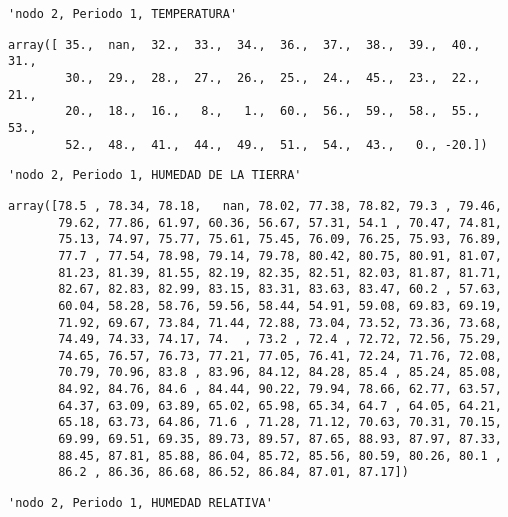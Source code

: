 \documentclass[11pt]{article}
\begin{document}
    
    
    \begin{verbatim}
'nodo 2, Periodo 1, TEMPERATURA'
    \end{verbatim}

    
    
    \begin{verbatim}
array([ 35.,  nan,  32.,  33.,  34.,  36.,  37.,  38.,  39.,  40.,  31.,
        30.,  29.,  28.,  27.,  26.,  25.,  24.,  45.,  23.,  22.,  21.,
        20.,  18.,  16.,   8.,   1.,  60.,  56.,  59.,  58.,  55.,  53.,
        52.,  48.,  41.,  44.,  49.,  51.,  54.,  43.,   0., -20.])
    \end{verbatim}

    
    
    \begin{verbatim}
'nodo 2, Periodo 1, HUMEDAD DE LA TIERRA'
    \end{verbatim}

    
    
    \begin{verbatim}
array([78.5 , 78.34, 78.18,   nan, 78.02, 77.38, 78.82, 79.3 , 79.46,
       79.62, 77.86, 61.97, 60.36, 56.67, 57.31, 54.1 , 70.47, 74.81,
       75.13, 74.97, 75.77, 75.61, 75.45, 76.09, 76.25, 75.93, 76.89,
       77.7 , 77.54, 78.98, 79.14, 79.78, 80.42, 80.75, 80.91, 81.07,
       81.23, 81.39, 81.55, 82.19, 82.35, 82.51, 82.03, 81.87, 81.71,
       82.67, 82.83, 82.99, 83.15, 83.31, 83.63, 83.47, 60.2 , 57.63,
       60.04, 58.28, 58.76, 59.56, 58.44, 54.91, 59.08, 69.83, 69.19,
       71.92, 69.67, 73.84, 71.44, 72.88, 73.04, 73.52, 73.36, 73.68,
       74.49, 74.33, 74.17, 74.  , 73.2 , 72.4 , 72.72, 72.56, 75.29,
       74.65, 76.57, 76.73, 77.21, 77.05, 76.41, 72.24, 71.76, 72.08,
       70.79, 70.96, 83.8 , 83.96, 84.12, 84.28, 85.4 , 85.24, 85.08,
       84.92, 84.76, 84.6 , 84.44, 90.22, 79.94, 78.66, 62.77, 63.57,
       64.37, 63.09, 63.89, 65.02, 65.98, 65.34, 64.7 , 64.05, 64.21,
       65.18, 63.73, 64.86, 71.6 , 71.28, 71.12, 70.63, 70.31, 70.15,
       69.99, 69.51, 69.35, 89.73, 89.57, 87.65, 88.93, 87.97, 87.33,
       88.45, 87.81, 85.88, 86.04, 85.72, 85.56, 80.59, 80.26, 80.1 ,
       86.2 , 86.36, 86.68, 86.52, 86.84, 87.01, 87.17])
    \end{verbatim}

    
    
    \begin{verbatim}
'nodo 2, Periodo 1, HUMEDAD RELATIVA'
    \end{verbatim}
\end{document}

